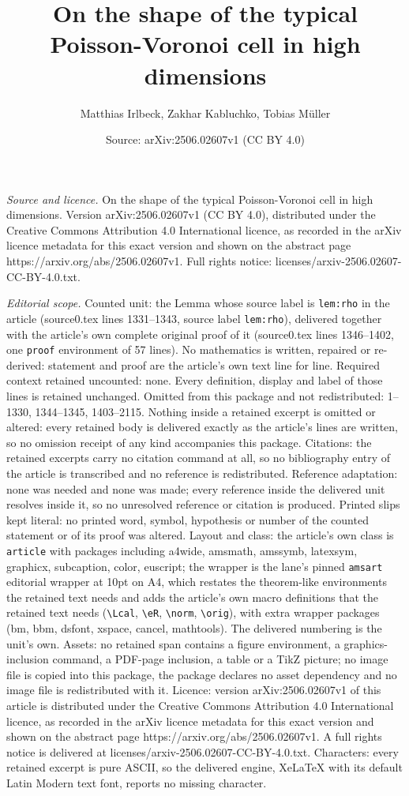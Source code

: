 \documentclass[10pt,a4paper]{amsart}
\title[On the shape of the typical Poisson-Voronoi cell in high dim]{On the shape of the typical Poisson-Voronoi cell in high dimensions}
\author{Matthias Irlbeck, Zakhar Kabluchko, Tobias M\"uller}
\date{Source: arXiv:2506.02607v1 (CC BY 4.0)}
\begin{document}
\maketitle

\noindent\emph{Source and licence.} On the shape of the typical Poisson-Voronoi cell in high dimensions. Version arXiv:2506.02607v1 (CC BY 4.0), distributed under the Creative Commons Attribution 4.0 International licence, as recorded in the arXiv licence metadata for this exact version and shown on the abstract page https://arxiv.org/abs/2506.02607v1. Full rights notice: licenses/arxiv-2506.02607-CC-BY-4.0.txt.\par\smallskip

\noindent\textit{Editorial scope.} Counted unit: the Lemma whose source label is \texttt{lem:rho} in the article (source0.tex lines 1331--1343, source label \texttt{lem:rho}), delivered together with the article's own complete original proof of it (source0.tex lines 1346--1402, one \texttt{proof} environment of 57 lines). No mathematics is written, repaired or re-derived: statement and proof are the article's own text line for line. Required context retained uncounted: none. Every definition, display and label of those lines is retained unchanged. Omitted from this package and not redistributed: 1--1330, 1344--1345, 1403--2115. Nothing inside a retained excerpt is omitted or altered: every retained body is delivered exactly as the article's lines are written, so no omission receipt of any kind accompanies this package. Citations: the retained excerpts carry no citation command at all, so no bibliography entry of the article is transcribed and no reference is redistributed. Reference adaptation: none was needed and none was made; every reference inside the delivered unit resolves inside it, so no unresolved reference or citation is produced. Printed slips kept literal: no printed word, symbol, hypothesis or number of the counted statement or of its proof was altered. Layout and class: the article's own class is \texttt{article} with packages including a4wide, amsmath, amssymb, latexsym, graphicx, subcaption, color, euscript; the wrapper is the lane's pinned \texttt{amsart} editorial wrapper at 10pt on A4, which restates the theorem-like environments the retained text needs and adds the article's own macro definitions that the retained text needs (\texttt{\textbackslash Lcal}, \texttt{\textbackslash eR}, \texttt{\textbackslash norm}, \texttt{\textbackslash orig}), with extra wrapper packages (bm, bbm, dsfont, xspace, cancel, mathtools). The delivered numbering is the unit's own. Assets: no retained span contains a figure environment, a graphics-inclusion command, a PDF-page inclusion, a table or a TikZ picture; no image file is copied into this package, the package declares no asset dependency and no image file is redistributed with it. Licence: version arXiv:2506.02607v1 of this article is distributed under the Creative Commons Attribution 4.0 International licence, as recorded in the arXiv licence metadata for this exact version and shown on the abstract page https://arxiv.org/abs/2506.02607v1. A full rights notice is delivered at licenses/arxiv-2506.02607-CC-BY-4.0.txt. Characters: every retained excerpt is pure ASCII, so the delivered engine, XeLaTeX with its default Latin Modern text font, reports no missing character.
\end{document}
